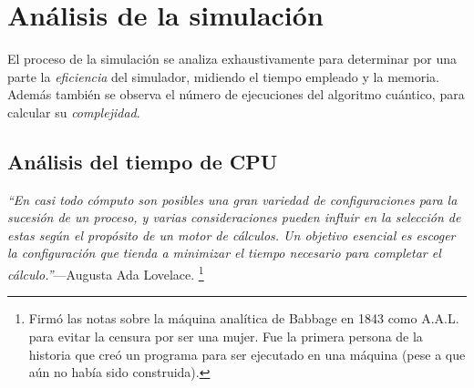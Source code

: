 \chapter{Análisis de la simulación}

El proceso de la simulación se analiza exhaustivamente para determinar por una 
parte la \textit{eficiencia} del simulador, midiendo el tiempo empleado y la 
memoria. Además también se observa el número de ejecuciones del algoritmo 
cuántico, para calcular su \textit{complejidad}.

%

\section{Análisis del tiempo de CPU}
\textsl{``En casi todo cómputo son posibles una gran variedad de configuraciones 
para la sucesión de un proceso, y varias consideraciones pueden influir en la 
selección de estas según el propósito de un motor de cálculos. Un objetivo 
esencial es escoger la configuración que tienda a minimizar el tiempo necesario 
para completar el cálculo.''}---Augusta Ada Lovelace.
\footnote{Firmó las notas sobre la máquina analítica de Babbage en 1843 como 
A.A.L. para evitar la censura por ser una mujer. Fue la primera persona de la 
historia que creó un programa para ser ejecutado en una máquina (pese a que aún 
no había sido construida).}
\newline

